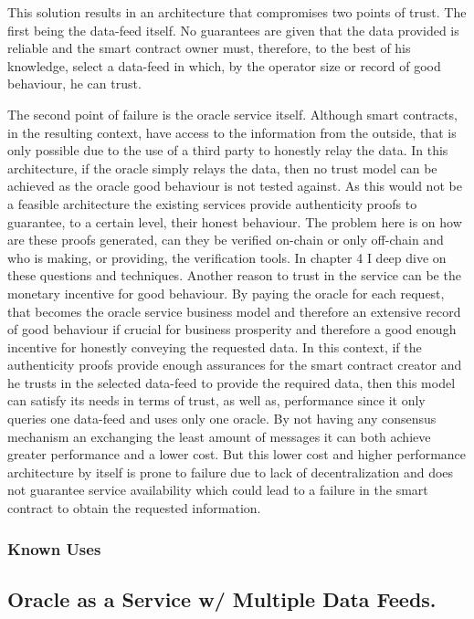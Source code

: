 This solution results in an architecture that compromises two points of trust. The first being the data-feed itself. No guarantees are given that the data provided is reliable and the smart contract owner must, therefore, to the best of his knowledge, select a data-feed in which, by the operator size or record of good behaviour, he can trust.

The second point of failure is the oracle service itself. Although smart contracts, in the resulting context, have access to the information from the outside, that is only possible due to the use of a third party to honestly relay the data. In this architecture, if the oracle simply relays the data, then no trust model can be achieved as the oracle good behaviour is not tested against. As this would not be a feasible architecture the existing services provide authenticity proofs to guarantee, to a certain level, their honest behaviour. The problem here is on how are these proofs generated, can they be verified on-chain or only off-chain and who is making, or providing, the verification tools. In chapter 4 I deep dive on these questions and techniques. Another reason to trust in the service can be the monetary incentive for good behaviour. By paying the oracle for each request, that becomes the oracle service business model and therefore an extensive record of good behaviour if crucial for business prosperity and therefore a good enough incentive for honestly conveying the requested data.
In this context, if the authenticity proofs provide enough assurances for the smart contract creator and he trusts in the selected data-feed to provide the required data, then this model can satisfy its needs in terms of trust, as well as, performance since it only queries one data-feed and uses only one oracle. By not having any consensus mechanism an exchanging the least amount of messages it can both achieve greater performance and a lower cost. But this lower cost and higher performance architecture by itself is prone to failure due to lack of decentralization and does not guarantee service availability which could lead to a failure in the smart contract to obtain the requested information.

\subsubsection{Known Uses}


\subsection{Oracle as a Service w/ Multiple Data Feeds.}


